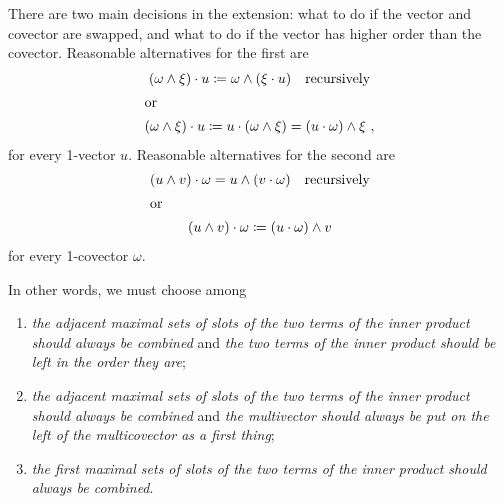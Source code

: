\documentclass[\ifafour a4paper,12pt,\else a5paper,10pt,\fi%
onecolumn,oneside,article,%
british%
]{memoir}
\theoremstyle{remark}
\theoremstyle{innote}
\newcommand*{\defd}{\coloneqq}
\renewcommand*{\|}[1][]{\nonscript\:#1\vert\nonscript\:\mathopen{}}
\begin{document}
There are two main decisions in the extension: what to do if the vector and
covector are swapped, and what to do if the vector has higher order than
the covector. Reasonable alternatives for the first are
\begin{subequations}
    \label{eq:inner_swap_alternative}
  \begin{gather}
    \label{eq:inner_swap_alternative_right}
    (\omega \land \xi) \cdot u \defd \omega\land (\xi \cdot u)
    \quad\text{recursively}
    \\\shortintertext{or}
    \label{eq:inner_swap_alternative_left}
    (\omega \land \xi) \cdot u \defd
   u \cdot (\omega \land \xi) = (u \cdot \omega)\land \xi \ ,
  \end{gather}
\end{subequations}
for every 1-vector $u$. Reasonable alternatives for the second are
\begin{subequations}
    \label{eq:inner_multiv_alternative}
  \begin{gather}
    \label{eq:inner_multiv_alternative_right}
   (u \land v) \cdot \omega = u \land (v \cdot \omega)
    \quad\text{recursively}
    \\\shortintertext{or}
    \label{eq:inner_multiv_alternative_left}
   (u \land v) \cdot \omega \defd (u \cdot \omega) \land v
  \end{gather}
\end{subequations}
for every 1-covector $\omega$.

In other words, we must choose among
\begin{enumerate}[label=(I\arabic*)]
\item \emph{the adjacent maximal sets of slots of the two terms of the
    inner product should always be combined} and \emph{the two terms of the
    inner product should be left in the order they are};
\item \emph{the adjacent maximal sets of slots of the two terms of the
    inner product should always be combined} and \emph{the multivector
    should always be put on the left of the multicovector as a first
    thing};
\item \emph{the first maximal sets of slots of the two terms of the inner
    product should always be combined}.
\end{enumerate}
\end{document}
